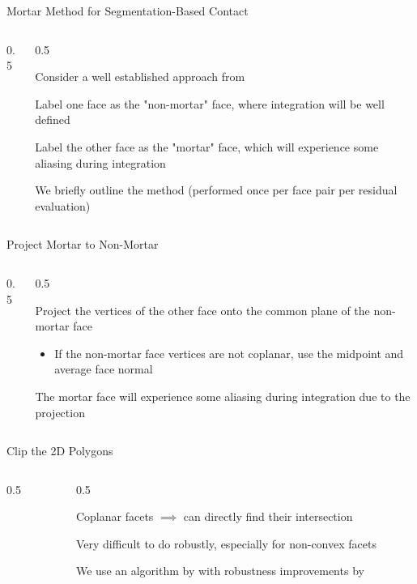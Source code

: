\documentclass{cubeamer}
\newlength{\textheightwithtitle}
\newenvironment{twocolimgleft}[2][width=\textwidth,height=\textheightwithtitle]
{\begin{columns}
    \begin{column}{0.5\textwidth}
         
     \end{column}
    \begin{column}{0.5\textwidth}
    }
    {
    \end{column}
\end{columns}}
\newcommand{\coverflag}{<+->}
\newenvironment{flagitemize}
  {\expandafter\itemize\expandafter[\coverflag]}
  {\enditemize}
\begin{document}
\begin{frame}{Mortar Method for Segmentation-Based Contact}
\begin{twocolimgleft}{img/segmentation_step_01.svg}
    \begin{flagitemize}
        \item Consider a well established approach from \cite{Puso_Laursen_2004}
        \item Label one face as the "non-mortar" face, where integration will be well defined
        \item Label the other face as the "mortar" face, which will experience some aliasing during integration
        \item We briefly outline the method (performed once per face pair per residual evaluation)
    \end{flagitemize}
\end{twocolimgleft}
\end{frame}

\begin{frame}{Project Mortar to Non-Mortar}
\begin{twocolimgleft}{img/segmentation_step_02.svg}
    \begin{flagitemize}
        \item Project the vertices of the other face onto the common plane of the non-mortar face
        \begin{itemize}
            \item If the non-mortar face vertices are not coplanar, use the midpoint and average face normal
        \end{itemize}
        \item The mortar face will experience some aliasing during integration due to the projection
    \end{flagitemize}
\end{twocolimgleft}
\end{frame}

\begin{frame}{Clip the 2D Polygons}
\begin{twocolimgleft}{img/segmentation_step_03.svg}
    \begin{flagitemize}
        \item Coplanar facets $\implies$ can directly find their intersection
        \item Very difficult to do robustly, especially for non-convex facets
        \item We use an algorithm by \cite{Greiner_Hormann_1998} with robustness improvements by \cite{Foster_Hormann_Popa_2019}
    \end{flagitemize}
\end{twocolimgleft}
\end{frame}
\end{document}
